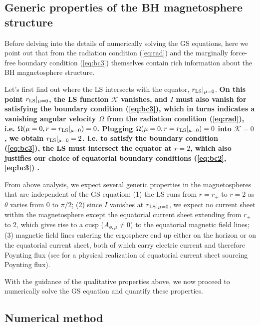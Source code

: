 \documentclass[aps,prd,reprint,nofootinbib, superscriptaddress]{revtex4-1}
\def\Am{A_{\phi,\mu}}
\begin{document}
\subsection{Generic properties of the BH magnetosphere structure}
\label{subsec:features}
Before delving into the details of numerically solving the GS equations,
here we point out that from the radiation condition (\ref{eq:rad}) and the marginally
force-free boundary condition (\ref{eq:bc3})
themselves contain rich information about the BH magnetosphere structure.

Let's first find out where the LS intersects with the equator, $r_{\rm LS}|_{\mu=0}$.
{\bf On this point $r_{\rm LS}|_{\mu=0}$,  the LS function $\mathcal K$ vanishes,
and $I$ must also vanish for satisfying the boundary condition (\ref{eq:bc3}),
which in turns indicates a vanishing angular velocity $\Omega$ from
the radiation condition (\ref{eq:rad}), i.e. $\Omega(\mu=0, r= r_{\rm LS}|_{\mu=0}) =0$. 
Plugging $\Omega(\mu=0, r= r_{\rm LS}|_{\mu=0}) =0$ into $\mathcal K = 0$,
we obtain $r_{\rm LS}|_{\mu=0}=2$. i.e.
to satisfy the boundary condition (\ref{eq:bc3}), the LS must intersect the equator at $r=2$, which also
justifies our choice of equatorial boundary conditions (\ref{eq:bc2},\ref{eq:bc3}) . }


From above analysis, we expect several generic properties in the magnetospheres that are independent
of the GS equation:
(1) the LS runs from $r=r_+$ to $r=2$ as $\theta$ varies from $0$ to $\pi/2$;
(2) since $I$ vanishes at $r_{\rm LS}|_{\mu=0}$, we expect no current sheet within the magnetosphere except the equatorial current
sheet extending from $r_+$ to $2$, which gives rise to a cusp ($\Am \neq 0$) to the equatorial magnetic field lines;
(3) magnetic field lines entering the ergosphere end up either on the horizon or on the equatorial current sheet,
both of which carry electric current and therefore Poynting flux (see \cite{Punsly1990} for a physical realization of
equatorial current sheet sourcing Poynting flux).

With the guidance of the qualitative properties above, we now proceed to numerically
solve the GS equation and quantify these properties.

\subsection{Numerical method}
\label{subsec:algorithm}
\end{document}
